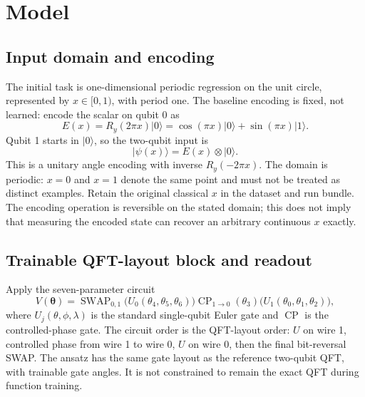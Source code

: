 \documentclass[11pt]{article}
\newcommand{\ket}[1]{\lvert #1\rangle}
\begin{document}
\section{Model}

\subsection{Input domain and encoding}

The initial task is one-dimensional periodic regression on the unit circle, represented by $x\in[0,1)$, with period one. The baseline encoding is fixed, not learned: encode the scalar on qubit 0 as
\begin{equation}
  E(x) = R_y(2\pi x)\ket{0}
       = \cos(\pi x)\ket{0}+\sin(\pi x)\ket{1}.
  \label{eq:encoding}
\end{equation}
Qubit 1 starts in $\ket{0}$, so the two-qubit input is
\begin{equation}
  \ket{\psi(x)} = E(x)\otimes\ket{0}.
\end{equation}
This is a unitary angle encoding with inverse $R_y(-2\pi x)$. The domain is periodic: $x=0$ and $x=1$ denote the same point and must not be treated as distinct examples. Retain the original classical $x$ in the dataset and run bundle. The encoding operation is reversible on the stated domain; this does not imply that measuring the encoded state can recover an arbitrary continuous $x$ exactly.

\subsection{Trainable QFT-layout block and readout}

Apply the seven-parameter circuit
\begin{equation}
  V(\boldsymbol{\theta}) = \operatorname{SWAP}_{0,1}
  \bigl(U_0(\theta_4,\theta_5,\theta_6)\bigr)
  \operatorname{CP}_{1\rightarrow0}(\theta_3)
  \bigl(U_1(\theta_0,\theta_1,\theta_2)\bigr),
  \label{eq:ansatz}
\end{equation}
where $U_j(\theta,\phi,\lambda)$ is the standard single-qubit Euler gate and $\operatorname{CP}$ is the controlled-phase gate. The circuit order is the QFT-layout order: $U$ on wire 1, controlled phase from wire 1 to wire 0, $U$ on wire 0, then the final bit-reversal SWAP. The ansatz has the same gate layout as the reference two-qubit QFT, with trainable gate angles. It is not constrained to remain the exact QFT during function training.
\end{document}
